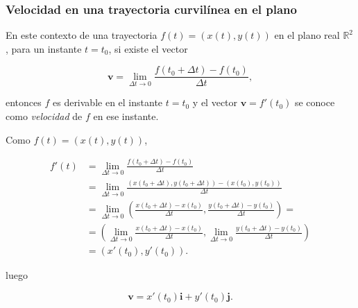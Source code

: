 \documentclass[
  a4paper,
]{scrreport}
\theoremstyle{definition}
\theoremstyle{plain}
\theoremstyle{definition}
\theoremstyle{definition}
\theoremstyle{plain}
\theoremstyle{plain}
\theoremstyle{remark}
\begin{document}
\subsubsection{Velocidad en una trayectoria curvilínea en el
plano}\label{velocidad-en-una-trayectoria-curviluxednea-en-el-plano}

En este contexto de una trayectoria \(f(t)=(x(t),y(t))\) en el plano
real \(\mathbb{R}^2\), para un instante \(t=t_0\), si existe el vector

\[
\mathbf{v} = \lim_{\Delta t\rightarrow 0} \frac{f(t_0+\Delta t)-f(t_0)}{\Delta t},
\]

entonces \(f\) es derivable en el instante \(t=t_0\) y el vector
\(\mathbf{v}=f'(t_0)\) se conoce como \emph{velocidad} de \(f\) en ese
instante.

Como \(f(t)=(x(t),y(t))\),

\begin{align*}
f'(t)&=\lim_{\Delta t\rightarrow 0} \frac{f(t_0+\Delta t)-f(t_0)}{\Delta t}\\ 
&= \lim_{\Delta t\rightarrow 0} \frac{(x(t_0+\Delta t),y(t_0+\Delta t))-(x(t_0),y(t_0))}{\Delta t} \\
&=  \lim_{\Delta t\rightarrow 0} \left(\frac{x(t_0+\Delta t)-x(t_0)}{\Delta t},\frac{y(t_0+\Delta t)-y(t_0)}{\Delta t}\right) =\\
&= \left(\lim_{\Delta t\rightarrow 0}\frac{x(t_0+\Delta t)-x(t_0)}{\Delta t},\lim_{\Delta t\rightarrow 0}\frac{y(t_0+\Delta t)-y(t_0)}{\Delta t}\right) \\ 
&=
(x'(t_0),y'(t_0)).
\end{align*}

luego

\[
\mathbf{v} = x'(t_0)\mathbf{i}+y'(t_0)\mathbf{j}.
\]
\end{document}
